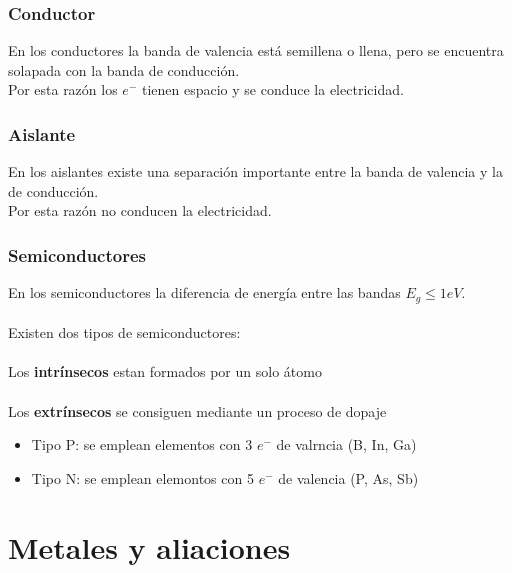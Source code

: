 \documentclass[12pt]{article}
\begin{document}
		\subsubsection{Conductor}
		En los conductores la banda de valencia está semillena o llena, pero se encuentra solapada con la banda de conducción. \\
		Por esta razón los $e^-$ tienen espacio y se conduce la electricidad.
		\subsubsection{Aislante}
		En los aislantes existe una separación importante entre la banda de valencia y la de conducción.\\
		Por esta razón no conducen la electricidad.
		\subsubsection{Semiconductores}
		En los semiconductores la diferencia de energía entre las bandas $E_g\leq 1eV$.\\ \\
		Existen dos tipos de semiconductores:\\ \\
		Los \textbf{intrínsecos} estan formados por un solo átomo \\ \\
		Los \textbf{extrínsecos} se consiguen mediante un proceso de dopaje
		\begin{itemize}
			\item Tipo P: se emplean elementos con 3 $e^-$ de valrncia (B, In, Ga)
			\item Tipo N: se emplean elemontos con 5 $e^-$ de valencia (P, As, Sb)
		\end{itemize}
		
		
\section{Metales y aliaciones}
\end{document}
